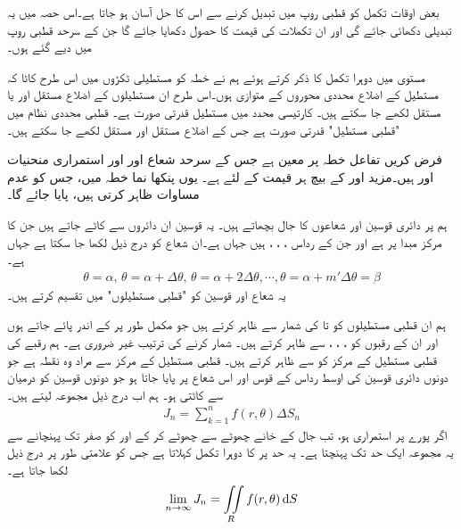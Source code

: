 بعض اوقات تکمل کو قطبی روپ میں تبدیل کرنے سے  اس کا حل آسان ہو جاتا ہے۔اس حصہ میں یہ تبدیلی دکھائی جائے گی اور ان تکملات کی قیمت کا حصول دکھایا جائے گا جن کے سرحد قطبی روپ میں دیے گئے ہوں۔

مستوی  میں دوہرا تکمل کا ذکر کرتے ہوئے  ہم نے خطہ  کو  مستطیلی ٹکڑوں میں اس طرح   کاٹا کہ مستطیل کے اضلاع محددی محوروں کے متوازی ہوں۔اس طرح   ان مستطیلوں کے اضلاع  مستقل  اور یا مستقل  لکھے جا سکتے  ہیں۔ کارتیسی محدد میں مستطیل قدرتی صورت ہے۔ قطبی محددی نظام میں "قطبی مستطیل" قدرتی صورت ہے جس کے اضلاع مستقل  اور مستقل  لکھے جا سکتے ہیں۔

فرض کریں تفاعل   خطہ  پر معین ہے  جس  کے سرحد شعاع  اور  اور استمراری منحنیات  اور   ہیں۔مزید  اور  کے بیچ ہر قیمت کے لئے  ہے۔ یوں   پنکھا نما  خطہ  میں، جس کو عدم مساوات  ظاہر کرتی ہیں، پایا جائے گا۔

ہم  پر  دائری قوسین  اور شعاعوں  کا جال بچھاتے ہیں۔  یہ قوسین ان دائروں سے کاٹے جاتے ہیں جن کا مرکز مبدا    پر ہے اور جن کے رداس ، ، ، ہیں جہاں  ہے۔ان شعاع کو درج ذیل لکھا جا سکتا ہے جہاں  ہے۔
\begin{align*}
\theta=\alpha,\, \theta=\alpha+\Delta \theta,\,\theta=\alpha+2\Delta \theta,\cdots, \theta=\alpha+m'\Delta\theta=\beta
\end{align*}
یہ شعاع اور قوسین  کو  "قطبی مستطیلوں" میں تقسیم کرتے ہیں۔

ہم ان قطبی مستطیلوں کو  تا   کی   شمار سے ظاہر کرتے ہیں جو مکمل طور پر   کے اندر پائے جاتے ہوں اور ان کے رقبوں کو ، ، ،  سے ظاہر کرتے ہیں۔ شمار کرنے کی ترتیب غیر ضروری ہے۔  ہم     رقبے کی قطبی مستطیل  کے  مرکز کو   سے ظاہر کرتے ہیں۔ قطبی مستطیل کے مرکز سے مراد وہ نقطہ ہے جو  دونوں دائری قوسین کی اوسط  رداس کے قوس  اور  اس شعاع پر پایا جاتا ہو جو دونوں قوسین کو درمیان سے کاٹتی ہو۔  ہم اب  درج ذیل مجموعہ لیتے ہیں۔
\begin{align}\label{مساوات_بالکثرت_قطبی_مجموعہ_الف}
J_n=\sum_{k=1}^n f(r,\theta)\Delta S_n
\end{align}
اگر  پورے  پر  استمراری ہو، تب جال کے خانے چھوٹے سے چھوٹے کر کے     اور  کو صفر تک پہنچانے سے  یہ مجموعہ ایک حد تک پہنچتا ہے۔ یہ حد  پر  کا دوہرا تکمل کہلاتا ہے جس کو علامتی طور پر درج ذیل لکھا جاتا ہے۔
\begin{align*}
\lim_{n\to\infty} J_n=\iint\limits_R f(r,\theta)\dif S
\end{align*}

